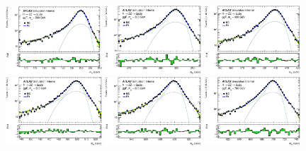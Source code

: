 \begin{figure}[htbp]
    \centering
    \includegraphics[width=0.32\textwidth]{figures/HMHZZ/signal/NWA//ggf_mass_signal_200_H4l_2mu2e.eps}
    \includegraphics[width=0.32\textwidth]{figures/HMHZZ/signal/NWA//ggf_mass_signal_300_H4l_2mu2e.eps}
    \includegraphics[width=0.32\textwidth]{figures/HMHZZ/signal/NWA//ggf_mass_signal_400_H4l_2mu2e.eps}\\
    \includegraphics[width=0.32\textwidth]{figures/HMHZZ/signal/NWA//ggf_mass_signal_500_H4l_2mu2e.eps}
    \includegraphics[width=0.32\textwidth]{figures/HMHZZ/signal/NWA//ggf_mass_signal_600_H4l_2mu2e.eps}
    \includegraphics[width=0.32\textwidth]{figures/HMHZZ/signal/NWA//ggf_mass_signal_700_H4l_2mu2e.eps}\\

\end{figure}
